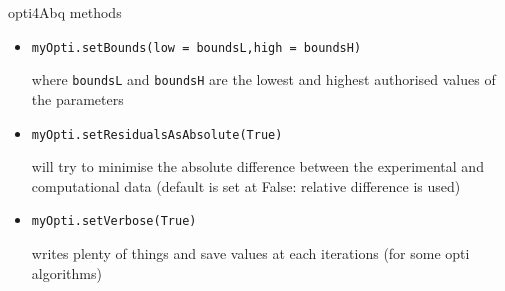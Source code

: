 \begin{frame}[fragile]{opti4Abq methods}
\begin{itemize}
\item\verb|myOpti.setBounds(low = boundsL,high = boundsH)|

where \verb|boundsL| and \verb|boundsH| are the lowest and highest authorised values of the parameters

\item\verb|myOpti.setResidualsAsAbsolute(True)|

will try to minimise the absolute difference between the experimental and computational data (default is set at False: relative difference is used)

\item\verb|myOpti.setVerbose(True)|

writes plenty of things and save values at each iterations (for some opti algorithms)

\end{itemize}
\end{frame}
